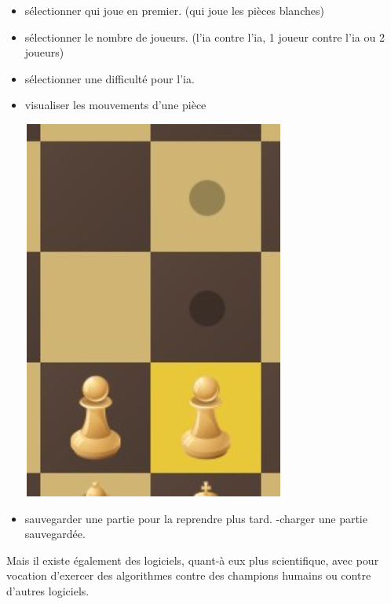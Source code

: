\documentclass{article}
\begin{document}
\begin{itemize}
\item sélectionner qui joue en premier. (qui joue les pièces blanches)
\item sélectionner le nombre de joueurs. (l'ia contre l'ia, 1 joueur contre l'ia ou 2 joueurs)
\item sélectionner une difficulté pour l'ia.
\item visualiser les mouvements d'une pièce
\newline
\centerline{\includegraphics[scale = 0.5]{img/Piece_move.png}}
\item sauvegarder une partie pour la reprendre plus tard. -charger une partie sauvegardée.
\newline\newline
\end{itemize}
Mais il existe également des logiciels, quant-à eux plus scientifique, avec pour vocation d'exercer  des algorithmes contre des champions humains ou contre d'autres logiciels.
\end{document}
